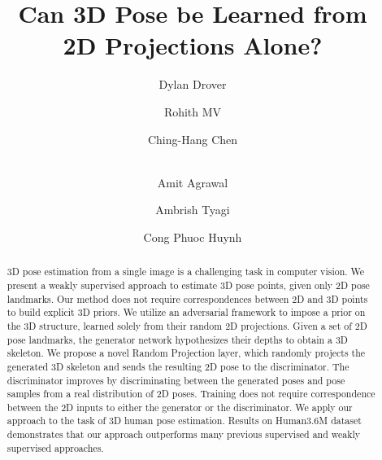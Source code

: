 \documentclass[runningheads]{llncs}
\begin{document}
%
\title{Can 3D Pose be Learned from \\ 2D Projections Alone?} 


 \author{Dylan Drover \and 
Rohith MV\and
Ching-Hang Chen \and\\ 
Amit Agrawal \and
Ambrish Tyagi \and 
Cong Phuoc Huynh}

%
%

%
\maketitle              %
%
\begin{abstract}
\label{sect:abstract}

3D pose estimation from a single image is a challenging task in computer vision. We present a weakly supervised approach to estimate 3D pose points, given only 2D pose landmarks. Our method does not require correspondences between 2D and 3D points to build explicit 3D priors. We utilize an adversarial framework to impose a prior on the 3D structure, learned solely from their random 2D projections. Given a set of 2D pose landmarks, the generator network hypothesizes their depths to obtain a 3D skeleton. We propose a novel Random Projection layer, which randomly projects the generated 3D skeleton and sends the resulting 2D pose to the discriminator. The discriminator improves by discriminating between the generated poses and pose samples from a real distribution of 2D poses. Training does not require  correspondence between the 2D inputs to either the generator or the discriminator.
We apply our approach to the task of 3D human pose estimation. Results on Human3.6M dataset demonstrates that our approach outperforms many previous supervised and weakly supervised approaches. 

\end{abstract}
\end{document}
